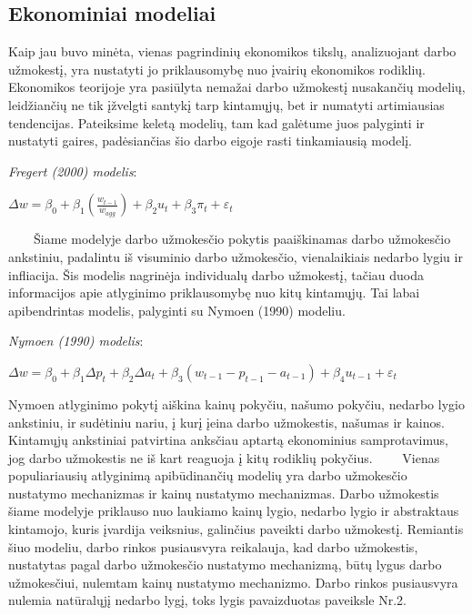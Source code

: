 \documentclass[12pt,a4paper]{article}
\theoremstyle{change}\newtheorem{salyga}{Uždavinys}
\begin{document}
\subsection{Ekonominiai modeliai}
\medskip
\hspace{40pt} Kaip jau buvo minėta, vienas pagrindinių ekonomikos tikslų, analizuojant darbo užmokestį, yra nustatyti jo priklausomybę nuo įvairių ekonomikos rodiklių. Ekonomikos teorijoje yra pasiūlyta nemažai darbo užmokestį nusakančių modelių, leidžiančių ne tik įžvelgti santykį tarp kintamųjų, bet ir numatyti artimiausias tendencijas. Pateiksime keletą modelių, tam kad galėtume juos palyginti ir nustatyti gaires, padėsiančias šio darbo eigoje rasti tinkamiausią modelį.
\vskip 8pt

\small  \textit{Fregert (2000) modelis}:
\begin{center}
\large $ \Delta w=\beta_0+\beta_1(\frac{w_{t-1}}{w_{agg}})+\beta_2u_t+\beta_3\pi_t+\varepsilon_t $
\end{center}
\vskip 8pt
$\qquad $Šiame modelyje darbo užmokesčio pokytis paaiškinamas darbo užmokesčio ankstiniu, padalintu iš visuminio darbo užmokesčio, vienalaikiais nedarbo lygiu ir infliacija. Šis modelis nagrinėja individualų darbo užmokestį, tačiau duoda informacijos apie atlyginimo priklausomybę nuo kitų kintamųjų. Tai labai apibendrintas modelis, palyginti su Nymoen (1990) modeliu.
\vskip 8pt

\small  \textit{Nymoen (1990) modelis}:
\begin{center}
\large $ \Delta w=\beta_0+\beta_1\Delta p_t+\beta_2\Delta a_t+\beta_3(w_{t-1}-p_{t-1}-a_{t-1})+\beta_4 u_{t-1}+\varepsilon_t$
\end{center}
\vskip 8pt
\hspace{40pt}Nymoen atlyginimo pokytį aiškina kainų pokyčiu, našumo pokyčiu, nedarbo lygio ankstiniu, ir sudėtiniu nariu, į kurį įeina darbo užmokestis, našumas ir kainos. Kintamųjų ankstiniai patvirtina anksčiau aptartą ekonominius samprotavimus, jog darbo užmokestis ne iš kart reaguoja į kitų rodiklių pokyčius. 
\vskip 8pt
$\qquad $Vienas populiariausių atlyginimą apibūdinančių modelių yra darbo užmokesčio nustatymo mechanizmas ir kainų nustatymo mechanizmas. Darbo užmokestis šiame modelyje priklauso nuo laukiamo kainų lygio, nedarbo lygio ir abstraktaus kintamojo, kuris įvardija veiksnius, galinčius paveikti darbo užmokestį. Remiantis šiuo modeliu, darbo rinkos pusiausvyra reikalauja, kad darbo užmokestis, nustatytas pagal darbo užmokesčio nustatymo mechanizmą, būtų lygus darbo užmokesčiui, nulemtam kainų nustatymo mechanizmo. Darbo rinkos pusiausvyra nulemia natūralųjį nedarbo lygį, toks lygis pavaizduotas paveiksle Nr.2.
\vskip 8pt
\end{document}
